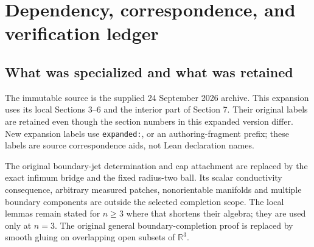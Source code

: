 \documentclass[11pt]{article}
\theoremstyle{definition}
\theoremstyle{remark}
\numberwithin{equation}{section}
\begin{document}
\section{Dependency, correspondence, and verification ledger}
\label{expanded:ledger}

\subsection{What was specialized and what was retained}
The immutable source is the supplied 24 September 2026 archive.
This expansion uses its local Sections 3--6 and the interior part of
Section 7. Their original labels are retained even though the section
numbers in this expanded version differ. New expansion labels use
\texttt{expanded:}, or an authoring-fragment prefix; these labels are
source correspondence aids, not Lean declaration names.

The original boundary-jet determination and cap attachment are replaced
by the exact infimum bridge and the fixed radius-two ball. Its scalar
conductivity consequence, arbitrary measured patches, nonorientable
manifolds and multiple boundary components are outside the selected
completion scope. The local lemmas remain stated for $n\geq3$ where
that shortens their algebra; they are used only at $n=3$. The original
general boundary-completion proof is replaced by smooth gluing on
overlapping open subsets of $\mathbb R^3$.
\end{document}
